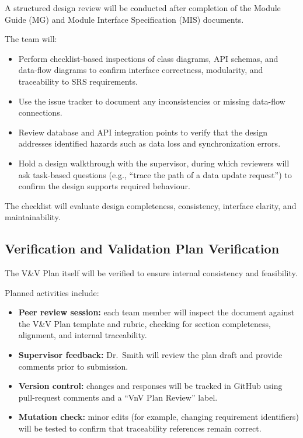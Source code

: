 \documentclass[12pt, titlepage]{article}
\begin{document}
A structured design review will be conducted after completion of the Module
Guide (MG) and Module Interface Specification (MIS) documents.

The team will:

\begin{itemize}
  \item Perform checklist-based inspections of class diagrams, API schemas, and
  data-flow diagrams to confirm interface correctness, modularity, and
  traceability to SRS requirements.

  \item Use the issue tracker to document any inconsistencies or missing
  data-flow connections.

  \item Review database and API integration points to verify that the design
  addresses identified hazards such as data loss and synchronization errors.

  \item Hold a design walkthrough with the supervisor, during which reviewers
  will ask task-based questions (e.g., ``trace the path of a data update
  request'') to confirm the design supports required behaviour.
\end{itemize}

The checklist will evaluate design completeness, consistency, interface
clarity, and maintainability.

\subsection{Verification and Validation Plan Verification}
\label{subsec:vnv-plan-verification}

The V\&V Plan itself will be verified to ensure internal consistency and
feasibility.

Planned activities include:

\begin{itemize}
  \item \textbf{Peer review session:} each team member will inspect the document
  against the V\&V Plan template and rubric, checking for section completeness,
  alignment, and internal traceability.

  \item \textbf{Supervisor feedback:} Dr.~Smith will review the plan draft and
  provide comments prior to submission.

  \item \textbf{Version control:} changes and responses will be tracked in
  GitHub using pull-request comments and a ``VnV Plan Review'' label.

  \item \textbf{Mutation check:} minor edits (for example, changing requirement
  identifiers) will be tested to confirm that traceability references remain
  correct.
\end{itemize}
\end{document}
